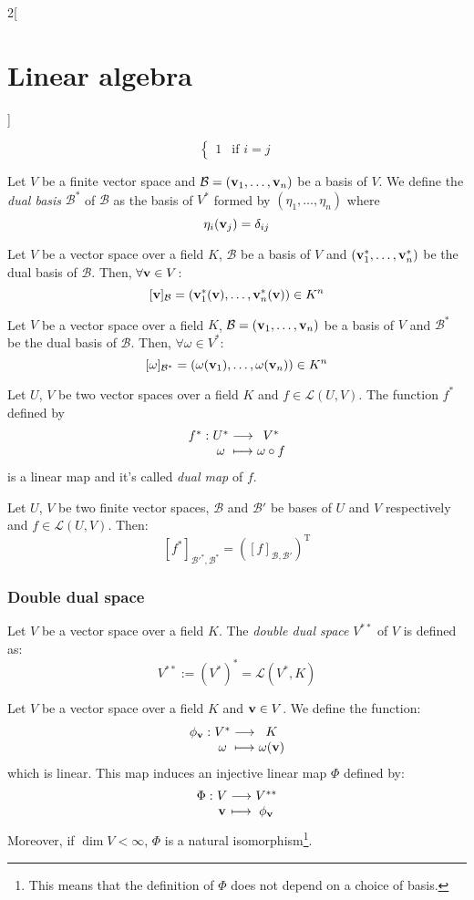 \documentclass[../../../main_math.tex]{subfiles}
\begin{document}
\begin{multicols}{2}[\section{Linear algebra}]
\begin{definition}
$$\begin{cases}
        1 & \text{if }i=j
      \end{cases}
    $$
  \end{definition}
  \begin{definition}
    Let $V$ be a finite vector space and $\mathcal{B}=(\boldsymbol{\mathrm{v}}_1,\ldots,\boldsymbol{\mathrm{v}}_n)$ be a basis of $V$. We define the \emph{dual basis} $\mathcal{B}^*$ of $\mathcal{B}$ as the basis of $V^*$ formed by $(\eta_1,\ldots,\eta_n)$ where $$\eta_i(\boldsymbol{\mathrm{v}}_j)=\delta_{ij}$$
  \end{definition}
  \begin{lemma}
    Let $V$ be a vector space over a field $K$, $\mathcal{B}$ be a basis of $V$ and $(\boldsymbol{\mathrm{v}}_1^*,\ldots,\boldsymbol{\mathrm{v}}_n^*)$ be the dual basis of $\mathcal{B}$. Then, $\forall \boldsymbol{\mathrm{v}}\in V$: $$[\boldsymbol{\mathrm{v}}]_\mathcal{B}=(\boldsymbol{\mathrm{v}}_1^*(\boldsymbol{\mathrm{v}}),\ldots,\boldsymbol{\mathrm{v}}_n^*(\boldsymbol{\mathrm{v}}))\in K^n$$
  \end{lemma}
  \begin{lemma}
    Let $V$ be a vector space over a field $K$, $\mathcal{B}=(\boldsymbol{\mathrm{v}}_1,\ldots,\boldsymbol{\mathrm{v}}_n)$ be a basis of $V$ and $\mathcal{B}^*$ be the dual basis of $\mathcal{B}$. Then, $\forall \omega\in V^*$: $$[\omega]_{\mathcal{B}^*}=(\omega(\boldsymbol{\mathrm{v}}_1),\ldots,\omega(\boldsymbol{\mathrm{v}}_n))\in K^n$$
  \end{lemma}
  \begin{definition}
    Let $U$, $V$ be two vector spaces over a field $K$ and $f\in \mathcal{L}(U,V)$. The function $f^*$ defined by
    $$\function{f^*}{U^*}{V^*}{\omega}{\omega\circ f}$$
    is a linear map and it's called \emph{dual map} of $f$.
  \end{definition}
  \begin{theorem}
    Let $U$, $V$ be two finite vector spaces, $\mathcal{B}$ and $\mathcal{B}'$ be bases of $U$ and $V$ respectively and $f\in\mathcal{L}(U,V)$. Then: $$[f^*]_{\mathcal{B}'^*,\mathcal{B}^*}={([f]_{\mathcal{B},\mathcal{B}'})}^\mathrm{T}$$
  \end{theorem}
  \subsubsection{Double dual space}
  \begin{definition}
    Let $V$ be a vector space over a field $K$. The \emph{double dual space} $V^{**}$ of $V$ is defined as: $$V^{**}:={(V^*)}^*=\mathcal{L}(V^*,K)$$
  \end{definition}
  \begin{proposition}
    Let $V$ be a vector space over a field $K$ and $\boldsymbol{\mathrm{v}}\in V$. We define the function:
    $$\function{\phi_{\vf{v}}}{V^*}{K}{\omega}{\omega(\vf{v})}$$
    which is linear. This map induces an injective linear map $\Phi$ defined by:
    $$\function{\Phi}{V}{V^{**}}{\vf{v}}{\phi_{\vf{v}}}$$
    Moreover, if $\dim V<\infty$, $\Phi$ is a natural isomorphism\footnote{This means that the definition of $\Phi$ does not depend on a choice of basis.}.
  \end{proposition}

\end{multicols}
\end{document}
